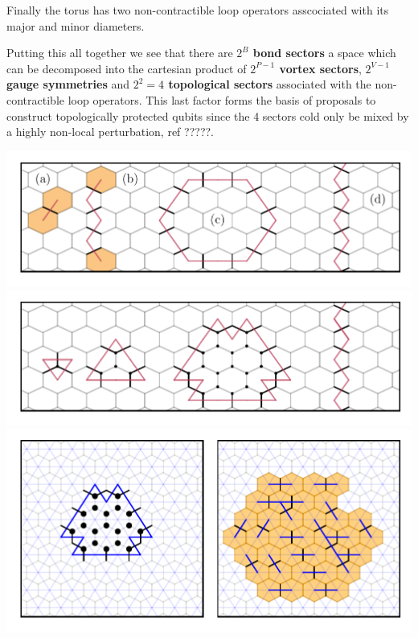Finally the torus has two non-contractible loop operators asscociated
with its major and minor diameters.

Putting this all together we see that there are \textbf{\(2^B\) bond
sectors} a space which can be decomposed into the cartesian product of
\textbf{\(2^{P-1}\) vortex sectors}, \textbf{\(2^{V-1}\) gauge
symmetries} and \textbf{\(2^2 = 4\) topological sectors} associated with
the non-contractible loop operators. This last factor forms the basis of
proposals to construct topologically protected qubits since the 4
sectors cold only be mixed by a highly non-local perturbation, ref
?????.

\includegraphics[width=1\textwidth,height=\textheight]{figure_code/amk_chapter/intro/types_of_dual_loops/types_of_dual_loops.pdf}
\includegraphics[width=1\textwidth,height=\textheight]{figure_code/amk_chapter/intro/gauge_symmetries/gauge_symmetries.pdf}
\includegraphics[width=1\textwidth,height=\textheight]{figure_code/amk_chapter/flood_fill/flood_fill.pdf}
